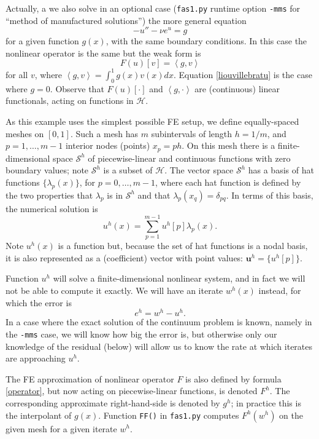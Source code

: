 \documentclass[letterpaper,final,12pt,reqno]{amsart}
\newcommand{\bu}{\mathbf{u}}
\newcommand{\ip}[2]{\left<#1,#2\right>}
\begin{document}
Actually, a we also solve in an optional case (\texttt{fas1.py} runtime option \texttt{-mms} for ``method of manufactured solutions'') the more general equation
  $$-u'' - \nu e^u = g$$
for a given function $g(x)$, with the same boundary conditions.  In this case the nonlinear operator is the same but the weak form is
\begin{equation}
  F(u)[v] = \ip{g}{v} \label{weakform}
\end{equation}
for all $v$, where $\ip{g}{v} = \int_0^1 g(x) v(x) dx$.  Equation \eqref{liouvillebratu} is the case where $g=0$.  Observe that $F(u)[\cdot]$ and $\ip{g}{\cdot}$ are (continuous) linear functionals, acting on functions in $\mathcal{H}$.

As this example uses the simplest possible FE setup, we define equally-spaced meshes on $[0,1]$.  Such a mesh has $m$ subintervals of length $h=1/m$, and $p=1,\dots,m-1$ interior nodes (points) $x_p=ph$.  On this mesh there is a finite-dimensional space $\mathcal{S}^h$ of piecewise-linear and continuous functions with zero boundary values; note $\mathcal{S}^h$ is a subset of $\mathcal{H}$.  The vector space $\mathcal{S}^h$ has a basis of hat functions $\{\lambda_p(x)\}$, for $p=0,\dots,m-1$, where each hat function is defined by the two properties that $\lambda_p$ is in $\mathcal{S}^h$ and that $\lambda_p(x_q)=\delta_{pq}$.  In terms of this basis, the numerical solution is
\begin{equation}
  u^h(x) = \sum_{p=1}^{m-1} u^h[p] \lambda_p(x).  \label{fesolution}
\end{equation}
Note $u^h(x)$ is a function but, because the set of hat functions is a nodal basis, it is also represented as a (coefficient) vector with point values: $\bu^h =\{u^h[p]\}$.

Function $u^h$ will solve a finite-dimensional nonlinear system, and in fact we will not be able to compute it exactly.  We will have an iterate $w^h(x)$ instead, for which the error is
\begin{equation}
  e^h = w^h - u^h.  \label{error}
\end{equation}
In a case where the exact solution of the continuum problem is known, namely in the \texttt{-mms} case, we will know how big the error is, but otherwise only our knowledge of the residual (below) will allow us to know the rate at which iterates are approaching $u^h$.

The FE approximation of nonlinear operator $F$ is also defined by formula \eqref{operator}, but now acting on piecewise-linear functions, is denoted $F^h$.  The corresponding approximate right-hand-side is denoted by $g^h$; in practice this is the interpolant of $g(x)$.  Function \texttt{FF()} in \texttt{fas1.py} computes $F^h(w^h)$ on the given mesh for a given iterate $w^h$.
\end{document}
